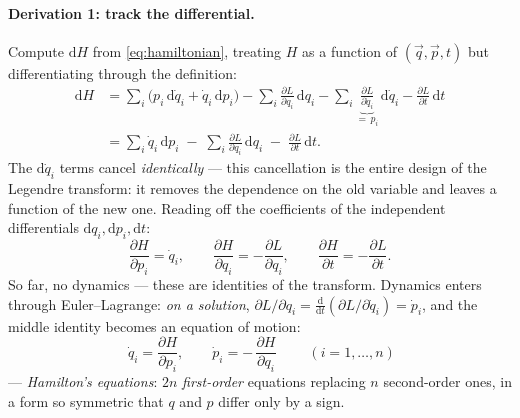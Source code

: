 \documentclass[11pt]{article}
\theoremstyle{plain}
\theoremstyle{definition}
\theoremstyle{remark}
\newcommand{\dd}{\mathrm{d}}
\newcommand{\pd}[2]{\frac{\partial #1}{\partial #2}}
\newcommand{\vq}{\vec{q}}
\newcommand{\vp}{\vec{p}}
\begin{document}
\paragraph{Derivation 1: track the differential.}
Compute $\dd H$ from \eqref{eq:hamiltonian}, treating $H$ as a function of
$(\vq, \vp, t)$ but differentiating through the definition:
\begin{align}
  \dd H
  &= \sum_i \bigl(p_i\,\dd\dot q_i + \dot q_i\,\dd p_i\bigr)
   - \sum_i \pd{L}{q_i}\,\dd q_i
   - \sum_i \underbrace{\pd{L}{\dot q_i}}_{=\,p_i}\,\dd\dot q_i
   - \pd{L}{t}\,\dd t \nonumber\\
  &= \sum_i \dot q_i\,\dd p_i
   \;-\; \sum_i \pd{L}{q_i}\,\dd q_i
   \;-\; \pd{L}{t}\,\dd t .
  \label{eq:dH}
\end{align}
The $\dd\dot q_i$ terms cancel \emph{identically} --- this cancellation is
the entire design of the Legendre transform: it removes the dependence on
the old variable and leaves a function of the new one. Reading off the
coefficients of the independent differentials $\dd q_i, \dd p_i, \dd t$:
\begin{equation}
  \pd{H}{p_i} = \dot q_i,
  \qquad
  \pd{H}{q_i} = -\pd{L}{q_i},
  \qquad
  \pd{H}{t} = -\pd{L}{t} .
  \label{eq:legendre-identities}
\end{equation}
So far, no dynamics --- these are identities of the transform. Dynamics
enters through Euler--Lagrange: \emph{on a solution},
$\partial L/\partial q_i = \tfrac{\dd}{\dd t}(\partial L/\partial\dot q_i)
= \dot p_i$, and the middle identity becomes an equation of motion:
\begin{equation}
  \boxed{\;
  \dot q_i = \pd{H}{p_i},
  \qquad
  \dot p_i = -\,\pd{H}{q_i}
  \;}
  \qquad (i = 1,\dots,n)
  \label{eq:hamilton-eqs}
\end{equation}
--- \emph{Hamilton's equations}: $2n$ \emph{first-order} equations
replacing $n$ second-order ones, in a form so symmetric that
$q$ and $p$ differ only by a sign.
\end{document}
